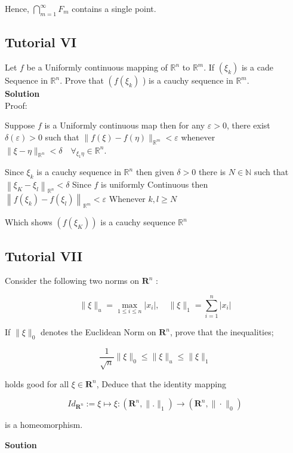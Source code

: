\documentclass{article}
\begin{document}
Hence, $\bigcap_{m=1}^{\infty} F_{m}$ contains a single point.
\newpage
\subsection{Tutorial VI}
Let $f$ be a Uniformly continuous mapping of $\mathbb{R}^{n}$ to $\mathbb{R}^{m}$. If $\left(\xi_{k}\right)$ is a cade Sequence in $\mathbb{R}^{n}$. Prove that $\left(f\left(\xi_{k}\right)\right.$ ) is a cauchy sequence in $\mathbb{R}^{m}$.\\

\textbf{Solution}\\

Proof:

Suppose $f$ is a Uniformly continuous map then for any $\varepsilon>0$, 
there exist $\delta(\varepsilon)>0$ such that $\|f(\xi)-f(\eta)\|_{\mathbb{R}^{m}}<\varepsilon$ whenever $\|\xi-\eta\|_{\mathbb{R}^{n}}<\delta \quad \forall_{\xi_{1} \eta} \in \mathbb{R}^{n}$. 

Since $\xi_{k}$ is a cauchy sequence in $\mathbb{R}^{n}$ then given $\delta>0$ there is $N \in \mathbb{N}$ such that $\left\|\xi_{K}-\xi_{l}\right\|_{\mathbb{R}^{n}}<\delta$ Since $f$ is uniformly Continuous then $\left\|f\left(\xi_{k}\right)-f\left(\xi_{l}\right)\right\|_{\mathbb{R}^{m}}<\varepsilon$ Whenever $k, l \geq N$

Which shows $\left(f\left(\xi_{K}\right)\right)$ is a cauchy sequence $ \mathbb{R}^{n}$

\subsection{Tutorial VII}
Consider the following two norms on $\mathbf{R}^{n}$ :

$$
\|\xi\|_{u}=\max _{1 \leq i \leq n}\left|x_{i}\right|, \quad\|\xi\|_{1}=\sum_{i=1}^{n}\left|x_{i}\right|
$$

If $\|\xi\|_{0}$ denotes the Euclidean Norm on $\mathbf{R}^{n}$, prove that the inequalities;

$$
\frac{1}{\sqrt{n}}\|\xi\|_{0} \leq\|\xi\|_{u} \leq\|\xi\|_{1}
$$

holds good for all $\xi \in \mathbf{R}^{n}$, Deduce that the identity mapping

$$
I d_{\mathbf{R}^{n}}:=\xi \mapsto \xi:\left(\mathbf{R}^{n},\|.\|_{1}\right) \longrightarrow\left(\mathbf{R}^{n},\|\cdot\|_{0}\right)
$$

is a homeomorphism.

\textbf{Soution}\\
\end{document}
